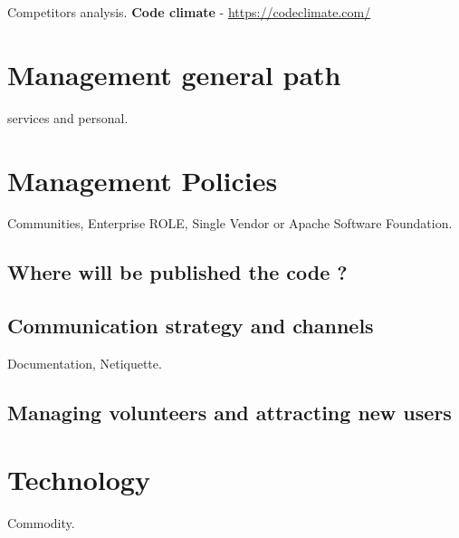 \documentclass[11pt]{scrartcl}
\begin{document}
\par Competitors analysis. \textbf{Code climate} - \url{https://codeclimate.com/}


\section{Management general path}
\label{sec:management-path}

\par services and personal.


\section{Management Policies}
\label{sec:management-policies}

\par Communities, Enterprise ROLE, Single Vendor or Apache Software Foundation.

\subsection{Where will be published the code ?}
\label{sub:publish-code}


\subsection{Communication strategy and channels}
\label{sub:communication-strategy}

\par Documentation, Netiquette.


\subsection{Managing volunteers and attracting new users}
\label{sub:volunteers-users}


\section{Technology}
\label{sec:technology}

\par Commodity.
\end{document}
